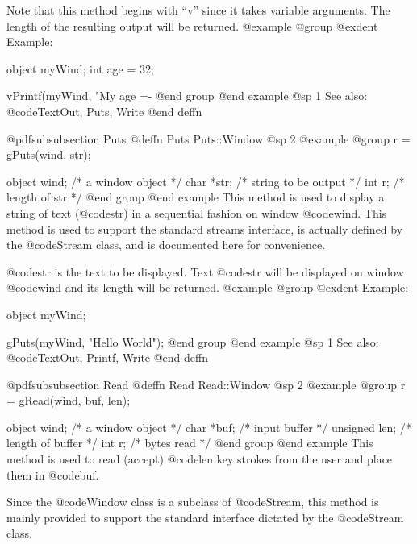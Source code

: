 Note that this method begins with ``v'' since it takes variable arguments.
The length of the resulting output will be returned.
@example
@group
@exdent Example:

object  myWind;
int     age = 32;

vPrintf(myWind, "My age =- %
@end group
@end example
@sp 1
See also:  @code{TextOut, Puts, Write}
@end deffn



















@pdfsubsubsection {Puts}
@deffn {Puts} Puts::Window
@sp 2
@example
@group
r = gPuts(wind, str);

object   wind;  /*  a window object       */
char    *str;   /*  string to be output   */
int      r;     /*  length of str         */
@end group
@end example
This method is used to display a string of text (@code{str}) in a sequential
fashion on window @code{wind}.  This method is used to support the standard
streams interface, is actually defined by the @code{Stream} class, and
is documented here for convenience.

@code{str} is the text to be displayed. Text @code{str} will be
displayed on window @code{wind} and its length will be returned.
@example
@group
@exdent Example:

object  myWind;

gPuts(myWind, "Hello World\n");
@end group
@end example
@sp 1
See also:  @code{TextOut, Printf, Write}
@end deffn











@pdfsubsubsection {Read}
@deffn {Read} Read::Window
@sp 2
@example
@group
r = gRead(wind, buf, len);

object   wind;  /*  a window object       */
char    *buf;   /*  input buffer          */
unsigned len;   /*  length of buffer      */
int      r;     /*  bytes read            */
@end group
@end example
This method is used to read (accept) @code{len} key strokes from the user
and place them in @code{buf}.

Since the @code{Window} class is a subclass of @code{Stream}, this
method is mainly provided to support the standard interface dictated by
the @code{Stream} class.

